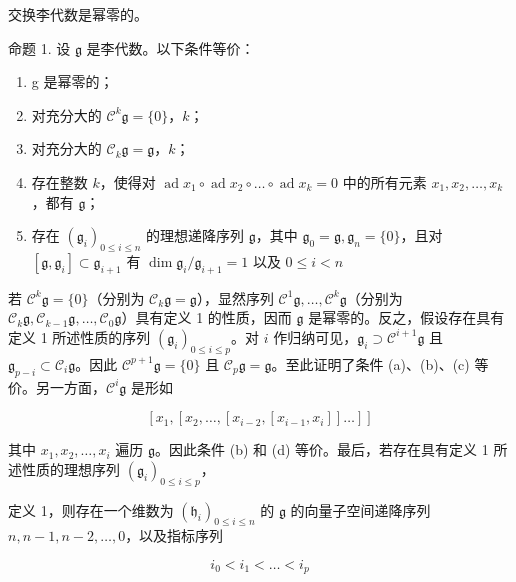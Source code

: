 交换李代数是幂零的。

命题 1. 设 \(\mathfrak{g}\) 是李代数。以下条件等价：

\begin{enumerate}
\def\labelenumi{(\alph{enumi})}
\item
  g 是幂零的；
\item
  对充分大的 \(\mathcal{C}^k\mathfrak{g} = \{0\}\)，\(k\)；
\item
  对充分大的 \(\mathcal{C}_k\mathfrak{g} = \mathfrak{g}\)，\(k\)；
\item
  存在整数 \(k\)，使得对 \(\operatorname{ad} x_1 \circ \operatorname{ad} x_2 \circ \dots \circ \operatorname{ad} x_k = 0\) 中的所有元素 \(x_1, x_2, \ldots, x_k\)，都有 \(\mathfrak{g}\)；
\item
  存在 \((\mathfrak{g}_i)_{0\leqslant i\leqslant n}\) 的理想递降序列 \(\mathfrak{g}\)，其中 \(\mathfrak{g}_0 = \mathfrak{g},\mathfrak{g}_n = \{0\}\)，且对 \([\mathfrak{g},\mathfrak{g}_i]\subset \mathfrak{g}_{i + 1}\) 有 \(\dim \mathfrak{g}_i / \mathfrak{g}_{i + 1} = 1\) 以及 \(0\leqslant i <   n\)
\end{enumerate}

若 \(\mathcal{C}^k\mathfrak{g} = \{0\}\)（分别为 \(\mathcal{C}_k\mathfrak{g} = \mathfrak{g}\)），显然序列 \(\mathcal{C}^1\mathfrak{g},\ldots ,\mathcal{C}^k\mathfrak{g}\)（分别为 \(\mathcal{C}_k\mathfrak{g},\mathcal{C}_{k - 1}\mathfrak{g},\ldots ,\mathcal{C}_0\mathfrak{g}\)）具有定义 1 的性质，因而 \(\mathfrak{g}\) 是幂零的。反之，假设存在具有定义 1 所述性质的序列 \((\mathfrak{g}_i)_{0\leqslant i\leqslant p}\)。对 \(i\) 作归纳可见，\(\mathfrak{g}_i\supset \mathcal{C}^{i + 1}\mathfrak{g}\) 且 \(\mathfrak{g}_{p - i}\subset \mathcal{C}_i\mathfrak{g}\)。因此 \(\mathcal{C}^{p + 1}\mathfrak{g} = \{0\}\) 且 \(\mathcal{C}_p\mathfrak{g} = \mathfrak{g}\)。至此证明了条件 (a)、(b)、(c) 等价。另一方面，\(\mathcal{C}^i\mathfrak{g}\) 是形如

\[
\left[ x _ {1}, \left[ x _ {2}, \dots , \left[ x _ {i - 2}, \left[ x _ {i - 1}, x _ {i} \right] \right] \dots \right] \right]
\]

其中 \(x_{1}, x_{2}, \ldots, x_{i}\) 遍历 \(\mathfrak{g}\)。因此条件 (b) 和 (d) 等价。最后，若存在具有定义 1 所述性质的理想序列 \((\mathfrak{g}_i)_{0 \leqslant i \leqslant p}\)，

定义 1，则存在一个维数为 \((\mathfrak{h}_i)_{0\leqslant i\leqslant n}\) 的 \(\mathfrak{g}\) 的向量子空间递降序列 \(n,n - 1,n - 2,\ldots ,0\)，以及指标序列

\[
i _ {0} <   i _ {1} <   \dots <   i _ {p}
\]


